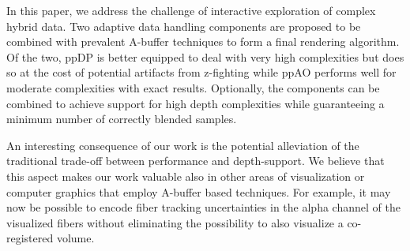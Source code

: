 \documentclass{egpubl}
\def\etal{\emph{et al.}}
\newcommand{\red}[1]{{\color{red}#1}}
\newcommand{\yellow}[1]{{\color{Goldenrod}#1}}
\newcommand{\minor}[1]{\yellow{#1}}
\newcommand{\ab}{\mbox{A-buffer}}
\newcommand{\dch}{DCH}
\newcommand{\stencil}{ppAO}
\newcommand{\dloop}{ppDP}
\begin{document}
In this paper, we address the challenge of interactive exploration of complex hybrid data. 
Two adaptive data handling components are proposed to be combined with prevalent \ab{} techniques to form a final rendering algorithm. 
Of the two, \dloop{} is better equipped to deal with very high complexities but does so at the cost of potential artifacts from z-fighting while \stencil{} performs well for moderate complexities with exact results. 
Optionally, the components can be combined to achieve support for high depth complexities while guaranteeing a minimum number of correctly blended samples. 

An interesting consequence of our work is the potential alleviation of the traditional trade-off between performance and depth-support. 
We believe that this aspect makes our work valuable also in other areas of visualization or computer graphics that employ \ab{} based techniques.
\minor{
For example, it may now be possible to encode fiber tracking uncertainties in the alpha channel of the visualized fibers without eliminating the possibility to also visualize a co-registered volume. 
}
%

\end{document}
